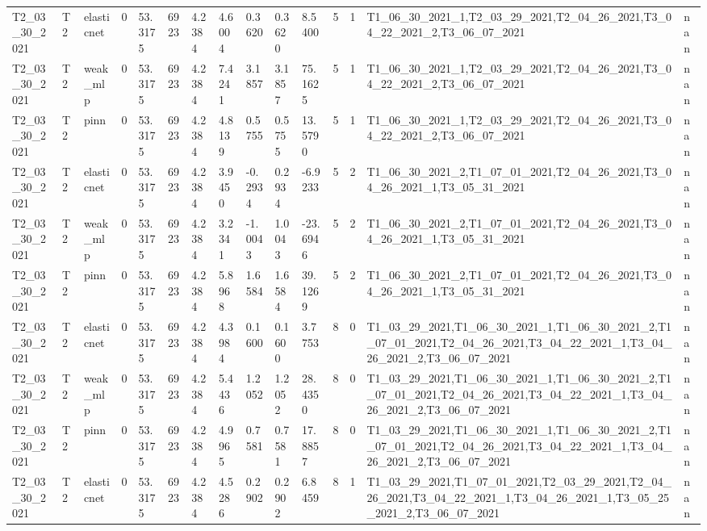 \begin{table}[t]
\begin{tabular}{lllllllllllllll}
T2\_03\_30\_2021 & T2 & elasticnet & 0 & 53.3175 & 6923 & 4.2384 & 4.6004 & 0.3620 & 0.3620 & 8.5400 & 5 & 1 & T1\_06\_30\_2021\_1,T2\_03\_29\_2021,T2\_04\_26\_2021,T3\_04\_22\_2021\_2,T3\_06\_07\_2021 & nan \\
T2\_03\_30\_2021 & T2 & weak\_mlp & 0 & 53.3175 & 6923 & 4.2384 & 7.4241 & 3.1857 & 3.1857 & 75.1625 & 5 & 1 & T1\_06\_30\_2021\_1,T2\_03\_29\_2021,T2\_04\_26\_2021,T3\_04\_22\_2021\_2,T3\_06\_07\_2021 & nan \\
T2\_03\_30\_2021 & T2 & pinn & 0 & 53.3175 & 6923 & 4.2384 & 4.8139 & 0.5755 & 0.5755 & 13.5790 & 5 & 1 & T1\_06\_30\_2021\_1,T2\_03\_29\_2021,T2\_04\_26\_2021,T3\_04\_22\_2021\_2,T3\_06\_07\_2021 & nan \\
T2\_03\_30\_2021 & T2 & elasticnet & 0 & 53.3175 & 6923 & 4.2384 & 3.9450 & -0.2934 & 0.2934 & -6.9233 & 5 & 2 & T1\_06\_30\_2021\_2,T1\_07\_01\_2021,T2\_04\_26\_2021,T3\_04\_26\_2021\_1,T3\_05\_31\_2021 & nan \\
T2\_03\_30\_2021 & T2 & weak\_mlp & 0 & 53.3175 & 6923 & 4.2384 & 3.2341 & -1.0043 & 1.0043 & -23.6946 & 5 & 2 & T1\_06\_30\_2021\_2,T1\_07\_01\_2021,T2\_04\_26\_2021,T3\_04\_26\_2021\_1,T3\_05\_31\_2021 & nan \\
T2\_03\_30\_2021 & T2 & pinn & 0 & 53.3175 & 6923 & 4.2384 & 5.8968 & 1.6584 & 1.6584 & 39.1269 & 5 & 2 & T1\_06\_30\_2021\_2,T1\_07\_01\_2021,T2\_04\_26\_2021,T3\_04\_26\_2021\_1,T3\_05\_31\_2021 & nan \\
T2\_03\_30\_2021 & T2 & elasticnet & 0 & 53.3175 & 6923 & 4.2384 & 4.3984 & 0.1600 & 0.1600 & 3.7753 & 8 & 0 & T1\_03\_29\_2021,T1\_06\_30\_2021\_1,T1\_06\_30\_2021\_2,T1\_07\_01\_2021,T2\_04\_26\_2021,T3\_04\_22\_2021\_1,T3\_04\_26\_2021\_2,T3\_06\_07\_2021 & nan \\
T2\_03\_30\_2021 & T2 & weak\_mlp & 0 & 53.3175 & 6923 & 4.2384 & 5.4436 & 1.2052 & 1.2052 & 28.4350 & 8 & 0 & T1\_03\_29\_2021,T1\_06\_30\_2021\_1,T1\_06\_30\_2021\_2,T1\_07\_01\_2021,T2\_04\_26\_2021,T3\_04\_22\_2021\_1,T3\_04\_26\_2021\_2,T3\_06\_07\_2021 & nan \\
T2\_03\_30\_2021 & T2 & pinn & 0 & 53.3175 & 6923 & 4.2384 & 4.9965 & 0.7581 & 0.7581 & 17.8857 & 8 & 0 & T1\_03\_29\_2021,T1\_06\_30\_2021\_1,T1\_06\_30\_2021\_2,T1\_07\_01\_2021,T2\_04\_26\_2021,T3\_04\_22\_2021\_1,T3\_04\_26\_2021\_2,T3\_06\_07\_2021 & nan \\
T2\_03\_30\_2021 & T2 & elasticnet & 0 & 53.3175 & 6923 & 4.2384 & 4.5286 & 0.2902 & 0.2902 & 6.8459 & 8 & 1 & T1\_03\_29\_2021,T1\_07\_01\_2021,T2\_03\_29\_2021,T2\_04\_26\_2021,T3\_04\_22\_2021\_1,T3\_04\_26\_2021\_1,T3\_05\_25\_2021\_2,T3\_06\_07\_2021 & nan \\

\end{tabular}
\end{table}
